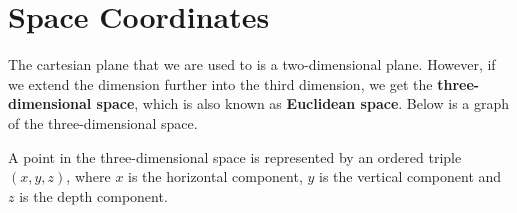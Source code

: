 \documentclass{report}
\begin{document}
\section*{Space Coordinates}

The cartesian plane that we are used to is a two-dimensional plane. However, if
we extend the dimension further into the third dimension, we get the
\textbf{three-dimensional space}, which is also known as \textbf{Euclidean
    space}. Below is a graph of the three-dimensional space.
\begin{center}
\end{center}
A point in the three-dimensional space is represented by an ordered triple $(x, y, z)$, where $x$ is the horizontal component, $y$ is the vertical component and $z$ is the depth component.
\end{document}

